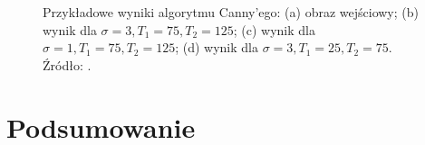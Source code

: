 \documentclass[a4paper,twocolumn,12pt]{article}
\begin{document}
\begin{figure}[!ht]
 \begin{center}
 \end{center}
 \caption{
  Przykładowe wyniki algorytmu Canny'ego:
  (a) obraz wejściowy;
  (b) wynik dla $\sigma = 3, T_1 = 75, T_2 = 125$;
  (c) wynik dla $\sigma = 1, T_1 = 75, T_2 = 125$;
  (d) wynik dla $\sigma = 3, T_1 = 25, T_2 = 75$.
  Źródło: \cite{boldak}.
 }
 \label{fig:canny_comparison}
\end{figure}



\section{Podsumowanie} \label{sec:summary}
\end{document}
